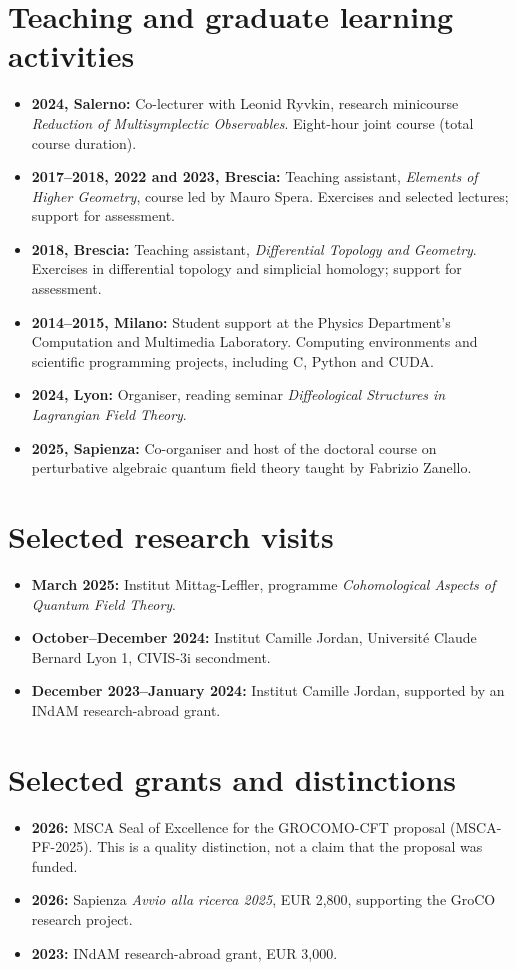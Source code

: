 \documentclass[11pt,a4paper]{article}
\newcommand{\AI}[1]{{\color{red}#1}}
\begin{document}
\section*{Teaching and graduate learning activities}
\begin{itemize}
\item \textbf{2024, Salerno:} Co-lecturer with Leonid Ryvkin, research minicourse \emph{Reduction of Multisymplectic Observables}. Eight-hour joint course (total course duration).
\item \textbf{2017--2018, 2022 and 2023, Brescia:} Teaching assistant, \emph{Elements of Higher Geometry}, course led by Mauro Spera. Exercises and selected lectures; support for assessment.
\item \textbf{2018, Brescia:} Teaching assistant, \emph{Differential Topology and Geometry}. Exercises in differential topology and simplicial homology; support for assessment.
\item \textbf{2014--2015, Milano:} Student support at the Physics Department's Computation and Multimedia Laboratory. Computing environments and scientific programming projects, including C, Python and CUDA.
\item \textbf{2024, Lyon:} Organiser, reading seminar \emph{Diffeological Structures in Lagrangian Field Theory}.
\item \textbf{2025, Sapienza:} Co-organiser and host of the doctoral course on perturbative algebraic quantum field theory taught by Fabrizio Zanello.
\end{itemize}
\section*{Selected research visits}
\begin{itemize}
\item \textbf{March 2025:} Institut Mittag-Leffler, programme \emph{Cohomological Aspects of Quantum Field Theory}.
\item \textbf{October--December 2024:} Institut Camille Jordan, Universit\'e Claude Bernard Lyon 1, CIVIS-3i secondment.
\item \textbf{December 2023--January 2024:} Institut Camille Jordan, supported by an INdAM research-abroad grant.
\end{itemize}
\section*{Selected grants and distinctions}
\begin{itemize}
\item \textbf{2026:} MSCA Seal of Excellence for the GROCOMO-CFT proposal (MSCA-PF-2025). \AI{This is a quality distinction, not a claim that the proposal was funded.}
\item \textbf{2026:} Sapienza \emph{Avvio alla ricerca 2025}, EUR 2,800, supporting the GroCO research project.
\item \textbf{2023:} INdAM research-abroad grant, EUR 3,000.
\end{itemize}
\end{document}

